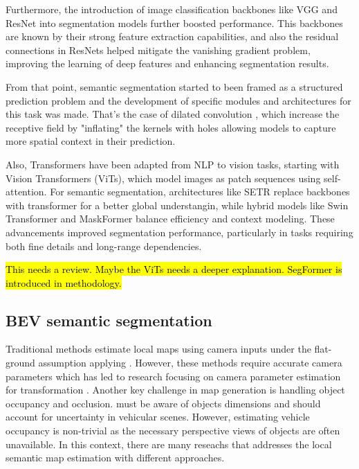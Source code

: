 Furthermore, the introduction of image classification backbones like VGG \cite{VGG} and ResNet \cite{ResNet} into segmentation models further boosted performance. This backbones are known by their strong feature extraction capabilities, and also the residual connections in ResNets helped mitigate the vanishing gradient problem, improving the learning of deep features and enhancing segmentation results.

From that point, semantic segmentation started to been framed as a structured prediction problem and the development of specific modules and architectures for this task was made. That's the case of dilated convolution \cite{ditaled_conv}, which increase the receptive field by "inflating" the  kernels with holes allowing models to capture more spatial context in their prediction.

Also, Transformers have been adapted from NLP to vision tasks, starting with Vision Transformers (ViTs), which model images as patch sequences using self-attention. For semantic segmentation, architectures like SETR replace  backbones with transformer for a better global understangin, while hybrid models like Swin Transformer and MaskFormer balance efficiency and context modeling. These advancements improved segmentation performance, particularly in tasks requiring both fine details and long-range dependencies.

\hl{This needs a review. Maybe the ViTs needs a deeper explanation. SegFormer is introduced in methodology.}


\subsection{BEV semantic segmentation}
Traditional methods \cite{3d_traffic_scene_understanding} estimate local  maps using camera inputs under the flat-ground assumption applying . However, these methods require accurate camera parameters which has led to research focusing on camera parameter estimation for  transformation \cite{BEV_params_estimation1} \cite{BEV_params_estimation2}. Another key challenge in  map generation is handling object occupancy and occlusion.  must be aware of objects dimensions and should account for uncertainty in vehicular scenes. However, estimating vehicle occupancy is non-trivial as the necessary perspective views of objects are often unavailable. In this context, there are many reseachs that addresses the local semantic map estimation with different approaches.

